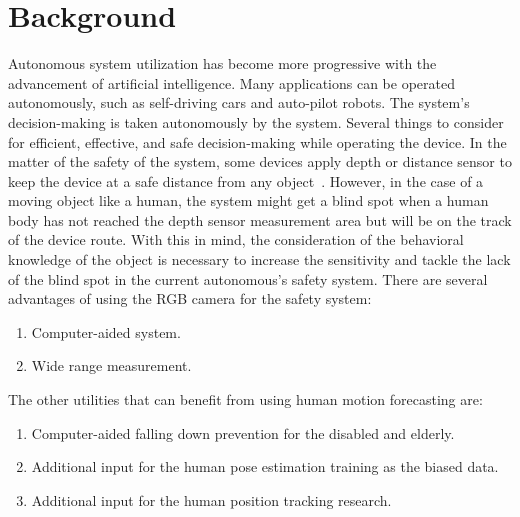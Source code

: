 \section{Background}\label{1:background} %
Autonomous system utilization has become more progressive with the advancement of artificial intelligence. Many applications can be operated autonomously, such as self-driving cars and auto-pilot robots. The system's decision-making is taken autonomously by the system. Several things to consider for efficient, effective, and safe decision-making while operating the device. In the matter of the safety of the system, some devices apply depth or distance sensor\cite{sensor, ultrasonic_sensor} to keep the device at a safe distance from any object~\cite{overview-autonomous, sensor-heavyvehicle}. However, in the case of a moving object like a human, the system might get a blind spot when a human body has not reached the depth sensor measurement area but will be on the track of the device route. With this in mind, the consideration of the behavioral knowledge of the object is necessary to increase the sensitivity and tackle the lack of the blind spot in the current autonomous's safety system.
There are several advantages of using the RGB camera for the safety system:
\begin{enumerate}
    \item Computer-aided system.
    \item Wide range measurement.
\end{enumerate}
The other utilities that can benefit from using human motion forecasting are:
\begin{enumerate}
    \item Computer-aided falling down prevention for the disabled and elderly.
    \item Additional input for the human pose estimation training as the biased data.
    \item Additional input for the human position tracking research.
\end{enumerate}

